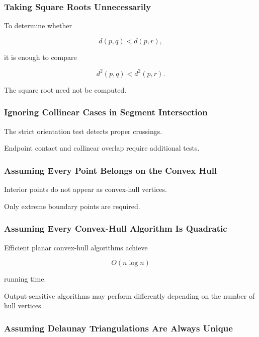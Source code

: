 \subsubsection{Taking Square Roots Unnecessarily}

To determine whether

\[
d(p,q)<d(p,r),
\]

it is enough to compare

\[
\boxed{
d^2(p,q)<d^2(p,r).
}
\]

The square root need not be computed.

\subsubsection{Ignoring Collinear Cases in Segment Intersection}

The strict orientation test detects proper crossings.

Endpoint contact and collinear overlap require additional tests.

\subsubsection{Assuming Every Point Belongs on the Convex Hull}

Interior points do not appear as convex-hull vertices.

Only extreme boundary points are required.

\subsubsection{Assuming Every Convex-Hull Algorithm Is Quadratic}

Efficient planar convex-hull algorithms achieve

\[
\boxed{
O(n\log n)
}
\]

running time.

Output-sensitive algorithms may perform differently depending on the number
of hull vertices.

\subsubsection{Assuming Delaunay Triangulations Are Always Unique}

